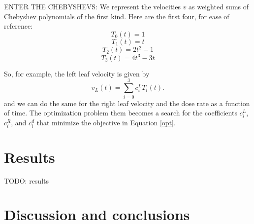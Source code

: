 \documentclass[12pt]{article}
\begin{document}
ENTER THE CHEBYSHEVS: We represent the velocities $v$ as weighted sums of Chebyshev polynomials of the first kind.
Here are the first four, for ease of reference:
$$
T_0(t) = 1
$$
$$
T_1(t) = t
$$
$$
T_2(t) = 2t^2 -1
$$
$$
T_3(t) = 4t^3 - 3t
$$


So, for example, the left leaf velocity is given by
$$
v_L(t) = \sum_{i=0}^3 c^L_i T_i(t).
$$
\noindent and we can do the same for the right leaf velocity and the dose rate as a function of time.
The optimization problem them becomes a search for the coefficients $c^L_i$, $c^R_i$, and $c^d_i$ that minimize the objective in Equation \ref{opt}.

\section{Results}

TODO:  results

\section{Discussion and conclusions}



\end{document}
